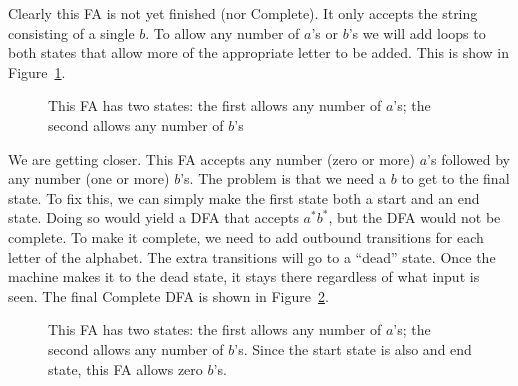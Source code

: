 \documentclass[letterpaper,12pt,openany,reqno]{book}%
\newcommand{\fanonterminalnode}[2] {\node at (#1) (#2) [circle, draw, minimum size=24pt] {#2};}
\newcommand{\fatransition}[3] {\draw [->] (#1) -- (#2) node [midway, above] {#3};}
\newcommand{\falooptop}[2] {\path (#1) edge [loop above] node {#2} ();}
\newcommand{\faloopbottom}[2] {\path (#1) edge [loop below] node {#2} ();}
\begin{document}
Clearly this FA is not yet finished (nor Complete). It only accepts the string consisting of a single $b$. To allow any number of $a$'s or $b$'s we will add loops to both states that allow more of the appropriate letter to be added. This is show in Figure~\ref{F.FA_ab2}.

\begin{figure}[hbt]
\centering
{}
 \caption[Step 2 in drawing an FA for $a^* b^*$]{This FA has two states: the first allows any number of $a$'s; the second allows any number of $b$'s}
  \label{F.FA_ab2}
\end{figure}
We are getting closer. This FA accepts any number (zero or more) $a$'s followed by any number (one or more) $b$'s. The problem is that we need a $b$ to get to the final state. To fix this, we can simply make the first state both a start and an end state. Doing so would yield a DFA that accepts $a^* b^*$, but the DFA would not be complete. To make it complete, we need to add outbound transitions for each letter of the alphabet. The extra transitions will go to a ``dead'' state. Once the machine makes it to the dead state, it stays there regardless of what input is seen. The final Complete DFA is shown in Figure~\ref{F.FA_ab3}.

\begin{figure}[hbt]
\centering
{}
 \caption[A Complete DFA for $a^* b^*$]{This FA has two states: the first allows any number of $a$'s; the second allows any number of $b$'s. Since the start state is also and end state, this FA allows zero $b$'s.}
  \label{F.FA_ab3}
\end{figure}
\end{document}
